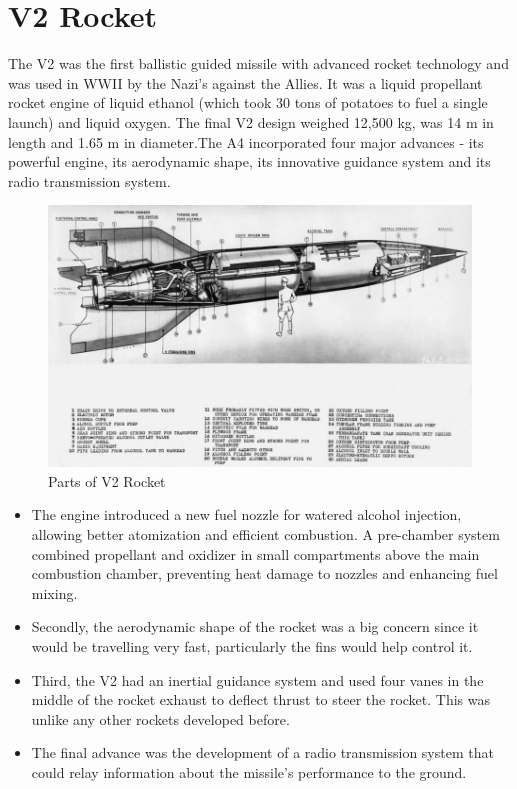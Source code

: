 \documentclass[8pt]{article} %
\begin{document}
\section{V2 Rocket}
The V2 was the first ballistic guided missile with advanced rocket technology and was used in WWII by the Nazi’s against the Allies. It was a liquid propellant rocket engine of liquid ethanol (which took 30 tons of potatoes to fuel a single launch) and liquid oxygen. The final V2 design weighed 12,500 kg, was 14 m in length and 1.65 m in diameter.The A4 incorporated four major advances - its powerful engine, its aerodynamic shape, its innovative guidance system and its radio transmission system.\cite{V2 Rocket}
\begin{figure}[H] 
\centering
\includegraphics[width=0.5\columnwidth]{./v2rocket.jpg}
\caption{Parts of V2 Rocket}
\label{fig:v2rocket}
\end{figure}
\begin{itemize}
\item The engine introduced a new fuel nozzle for watered alcohol injection, allowing better atomization and efficient combustion. A pre-chamber system combined propellant and oxidizer in small compartments above the main combustion chamber, preventing heat damage to nozzles and enhancing fuel mixing.
\item Secondly, the aerodynamic shape of the rocket was a big concern since it would be travelling very fast, particularly the fins would help control it. 
\item Third, the V2 had an inertial guidance system and used four vanes in the middle of the rocket exhaust to deflect thrust to steer the rocket. This was unlike any other rockets developed before.
\item The final advance was the development of a radio transmission system that could relay information about the missile's performance to the ground.
\end{itemize}
\end{document}
